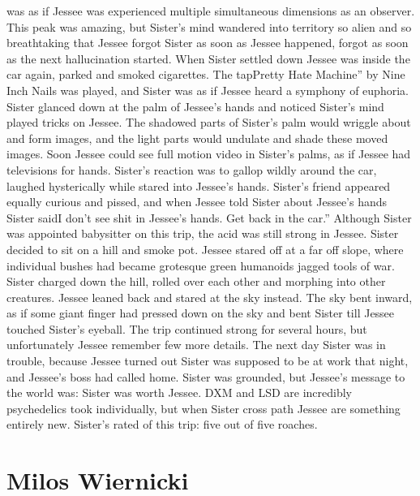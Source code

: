 \documentclass[12pt]{book}
\begin{document}
was as if Jessee was experienced multiple simultaneous dimensions as an observer. This peak was amazing, but Sister's mind wandered into territory so alien and so breathtaking that Jessee forgot Sister as soon as Jessee happened, forgot as soon as the next hallucination started. When Sister settled down Jessee was inside the car again, parked and smoked cigarettes. The tapPretty Hate Machine'' by Nine Inch Nails was played, and Sister was as if Jessee heard a symphony of euphoria. Sister glanced down at the palm of Jessee's hands and noticed Sister's mind played tricks on Jessee. The shadowed parts of Sister's palm would wriggle about and form images, and the light parts would undulate and shade these moved images. Soon Jessee could see full motion video in Sister's palms, as if Jessee had televisions for hands. Sister's reaction was to gallop wildly around the car, laughed hysterically while stared into Jessee's hands. Sister's friend appeared equally curious and pissed, and when Jessee told Sister about Jessee's hands Sister saidI don't see shit in Jessee's hands. Get back in the car.'' Although Sister was appointed babysitter on this trip, the acid was still strong in Jessee. Sister decided to sit on a hill and smoke pot. Jessee stared off at a far off slope, where individual bushes had became grotesque green humanoids  jagged tools of war. Sister charged down the hill, rolled over each other and morphing into other creatures. Jessee leaned back and stared at the sky instead. The sky bent inward, as if some giant finger had pressed down on the sky and bent Sister till Jessee touched Sister's eyeball. The trip continued strong for several hours, but unfortunately Jessee remember few more details. The next day Sister was in trouble, because Jessee turned out Sister was supposed to be at work that night, and Jessee's boss had called home. Sister was grounded, but Jessee's message to the world was: Sister was worth Jessee. DXM and LSD are incredibly psychedelics took individually, but when Sister cross path Jessee are something entirely new. Sister's rated of this trip: five out of five roaches.



\chapter{Milos Wiernicki}
\end{document}
